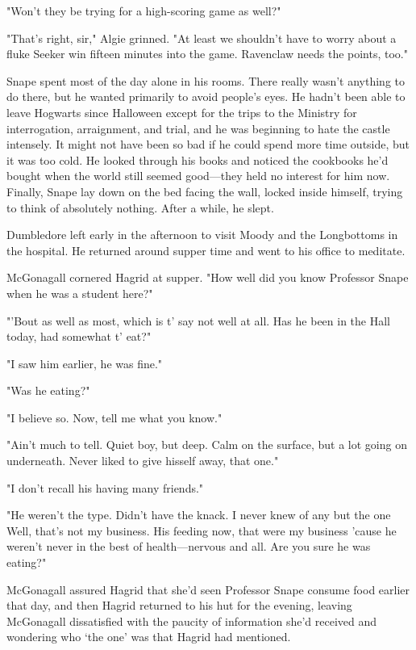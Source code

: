 "Won't they be trying for a high-scoring game as well?"

"That's right, sir," Algie grinned. "At least we shouldn't have to worry about a fluke Seeker win fifteen minutes into the game. Ravenclaw needs the points, too."

Snape spent most of the day alone in his rooms. There really wasn't anything to do there, but he wanted primarily to avoid people's eyes. He hadn't been able to leave Hogwarts since Halloween except for the trips to the Ministry for interrogation, arraignment, and trial, and he was beginning to hate the castle intensely. It might not have been so bad if he could spend more time outside, but it was too cold. He looked through his books and noticed the cookbooks he'd bought when the world still seemed good—they held no interest for him now. Finally, Snape lay down on the bed facing the wall, locked inside himself, trying to think of absolutely nothing. After a while, he slept.

Dumbledore left early in the afternoon to visit Moody and the Longbottoms in the hospital. He returned around supper time and went to his office to meditate.

McGonagall cornered Hagrid at supper. "How well did you know Professor Snape when he was a student here?"

"'Bout as well as most, which is t' say not well at all. Has he been in the Hall today, had somewhat t' eat?"

"I saw him earlier, he was fine."

"Was he eating?"

"I believe so. Now, tell me what you know."

"Ain't much to tell. Quiet boy, but deep. Calm on the surface, but a lot going on underneath. Never liked to give hisself away, that one."

"I don't recall his having many friends."

"He weren't the type. Didn't have the knack. I never knew of any but the one{\el} Well, that's not my business. His feeding now, that were my business 'cause he weren't never in the best of health—nervous and all. Are you sure he was eating?"

McGonagall assured Hagrid that she'd seen Professor Snape consume food earlier that day, and then Hagrid returned to his hut for the evening, leaving McGonagall dissatisfied with the paucity of information she'd received and wondering who `the one' was that Hagrid had mentioned.

